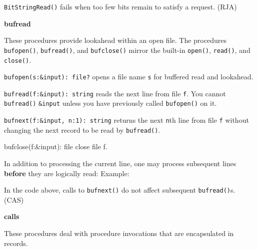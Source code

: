 \texttt{BitStringRead()} fails when too few bits remain to satisfy a
request. (RJA)

{\sffamily\bfseries
bufread}

These procedures provide lookahead within an open file. The procedures
\texttt{bufopen()}, \texttt{bufread()}, and \texttt{bufclose()} mirror
the built-in \texttt{open()}, \texttt{read()}, and \texttt{close()}.

\texttt{bufopen(s:\&input): file?} opens a file name \texttt{s} for
buffered read and lookahead.

\texttt{bufread(f:\&input): string} reads the next line from file
\texttt{f}. You cannot \texttt{bufread()} \texttt{\&input} unless you
have previously called \texttt{bufopen()} on it.

\texttt{bufnext(f:\&input, n:1): string} returns the next \texttt{n}th
line from file \texttt{f} without changing the next record to be read
by \texttt{bufread()}.

bufclose(f:\&input): file close file f.

In addition to processing the current line, one may process subsequent
lines \textbf{before} they are logically read: Example:



In the code above, calls to \texttt{bufnext()} do not affect subsequent
\texttt{bufread()}{\textquotesingle}s. (CAS)

{\sffamily\bfseries
calls}

These procedures deal with procedure
invocations that are encapsulated in records.

